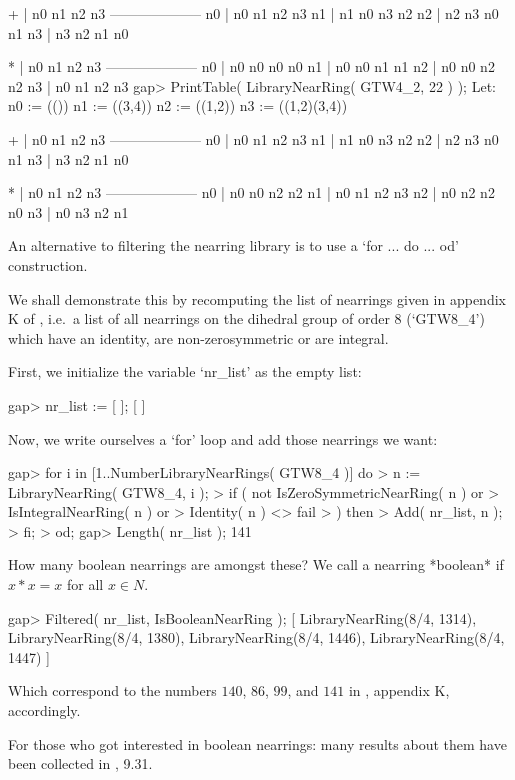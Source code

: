        +  | n0  n1  n2  n3  
      --------------------
      n0  | n0  n1  n2  n3  
      n1  | n1  n0  n3  n2  
      n2  | n2  n3  n0  n1  
      n3  | n3  n2  n1  n0  

       *  | n0  n1  n2  n3  
      --------------------
      n0  | n0  n0  n0  n0  
      n1  | n0  n0  n1  n1  
      n2  | n0  n0  n2  n2  
      n3  | n0  n1  n2  n3  
    gap> PrintTable( LibraryNearRing( GTW4_2, 22 ) );
    Let:
    n0 := (())
    n1 := ((3,4))
    n2 := ((1,2))
    n3 := ((1,2)(3,4))

       +  | n0  n1  n2  n3  
      --------------------
      n0  | n0  n1  n2  n3  
      n1  | n1  n0  n3  n2  
      n2  | n2  n3  n0  n1  
      n3  | n3  n2  n1  n0  

       *  | n0  n1  n2  n3  
      --------------------
      n0  | n0  n0  n2  n2  
      n1  | n0  n1  n2  n3  
      n2  | n0  n2  n2  n0  
      n3  | n0  n3  n2  n1  
\endexample



An alternative to filtering the nearring library is to
use a `for ... do ... od' construction.

We shall demonstrate this by recomputing the list
of nearrings given in appendix K of \cite{Pilz:Nearrings},
i.e.\ a list of all nearrings on the dihedral group of order $8$
(`GTW8_4') which have an identity, are non-zerosymmetric or
are integral.

First, we initialize the variable `nr_list' 
as the empty list:

\beginexample
    gap> nr_list := [ ];
    [ ]
\endexample

Now, we write ourselves a `for' loop and add those nearrings
we want:

\beginexample
    gap> for i in [1..NumberLibraryNearRings( GTW8_4 )] do  
    >       n := LibraryNearRing( GTW8_4, i );
    >       if ( not IsZeroSymmetricNearRing( n ) or     
    >            IsIntegralNearRing( n ) or          
    >            Identity( n ) <> fail    
    >          ) then              
    >         Add( nr_list, n );    
    >       fi;
    >    od;      
    gap> Length( nr_list );                                          
    141
\endexample

How many boolean nearrings are amongst these? We call a nearring
*boolean* if $x*x=x$ for all $x \in N$.

\beginexample
    gap> Filtered( nr_list, IsBooleanNearRing );
    [ LibraryNearRing(8/4, 1314), LibraryNearRing(8/4, 1380), 
      LibraryNearRing(8/4, 1446), LibraryNearRing(8/4, 1447) ]
\endexample

Which correspond to the numbers
$140$, $86$, $99$, and $141$ in
\cite{Pilz:Nearrings}, appendix K, accordingly.

For those who got interested in boolean nearrings:
many results about them have been collected in
\cite{Pilz:Nearrings}, 9.31.


